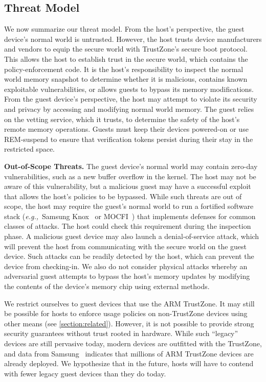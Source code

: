 \documentclass[pageno]{sig-alternate-05-2015}
\newcommand{\sectref}[1]{\autoref{#1}}
\newcommand{\myparagraph}[1]{\indent\par\noindent\textsf{\textbf{#1.}}}
\newcommand{\eg}{\textit{e.g.,}}
\begin{document}
\subsection{Threat Model} 
\label{section:threat}
%
We now summarize our threat model. From the host's perspective, the guest
device's normal world is untrusted. However, the host trusts device
manufacturers and vendors to equip the secure world with TrustZone's secure
boot protocol. This allows the host to establish trust in the secure world,
which contains the policy-enforcement code. It is the host's responsibility to
inspect the normal world memory snapshot to determine whether it is malicious,
contains known exploitable vulnerabilities, or allows guests to bypass its
memory modifications.  From the guest device's perspective, the host may
attempt to violate its security and privacy by accessing and modifying normal
world memory. The guest relies on the vetting service, which it trusts, to
determine the safety of the host's remote memory operations. Guests must keep
their devices powered-on or use REM-suspend to ensure that verification
tokens persist during their stay in the restricted space.

\myparagraph{Out-of-Scope Threats} The guest device's normal world may contain zero-day
vulnerabilities, such as a new buffer overflow in the kernel.  The host may not
be aware of this vulnerability, but a malicious guest may have a successful
exploit that allows the host's policies to be bypassed. While such threats are
out of scope, the host may require the guest's normal world to run a fortified
software stack (\eg~Samsung Knox~\cite{knox:ccs14} or
MOCFI~\cite{mocfi:ndss12}) that implements defenses for common classes of
attacks. The host could check this requirement during the inspection phase. A
malicious guest device may also launch a denial-of-service attack, which will
prevent the host from communicating with the secure world on the guest device.
Such attacks can be readily detected by the host, which can prevent the device
from checking-in. We also do not consider physical attacks whereby an
adversarial guest attempts to bypass the host's memory updates by modifying the
contents of the device's memory chip using external methods.

We restrict ourselves to guest devices that use the ARM TrustZone. It may still
be possible for hosts to enforce usage policies on non-TrustZone devices using
other means (see \sectref{section:related}). However, it is not possible to
provide strong security guarantees without trust rooted in hardware. While such
``legacy'' devices are still pervasive today, modern devices are outfitted with
the TrustZone, and data from Samsung~\cite{knox:ccs14} indicates that millions
of ARM TrustZone devices are already deployed. We hypothesize that in the
future, hosts will have to contend with fewer legacy guest devices than they do
today.
\end{document}
